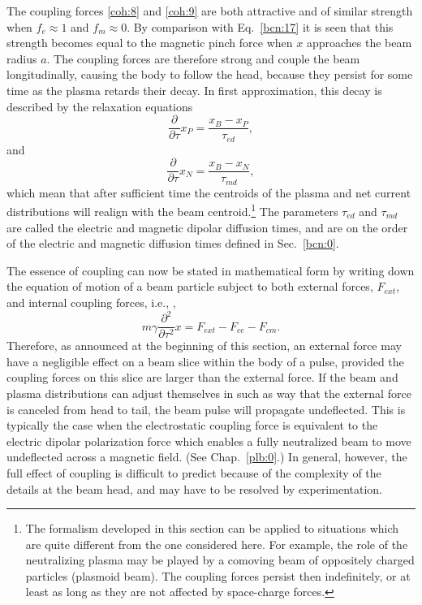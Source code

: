 \documentclass [12pt,a4paper,     ]{report} %
\begin{document}
   The coupling forces \eqref{coh:8} and \eqref{coh:9} are both attractive and of similar strength when $f_e \approx 1$ and $f_m \approx 0$.  By comparison with Eq.~\eqref{bcn:17} it is seen that this strength becomes equal to the magnetic pinch force when $x$ approaches the beam radius $a$. The coupling forces are therefore strong and couple the beam longitudinally, causing the body to follow the head, because they persist for some time as the plasma retards their decay.  In first approximation, this decay is described by the relaxation equations
%
\begin{equation}\label{coh:10} %
   \frac{\partial}{\partial \tau} x_P =  \frac{x_B-x_P}{\tau_{ed}},
\end{equation}
%
and
%
\begin{equation}\label{coh:11} %
  \frac{\partial}{\partial \tau} x_N =  \frac{x_B-x_N}{\tau_{md}},
\end{equation}
%
which mean that after sufficient time the centroids of the plasma and net current distributions will realign with the beam centroid.\footnote{The formalism developed in this section can be applied to situations which are quite different from the one considered here.  For example, the role of the neutralizing plasma may be played by a comoving beam of oppositely charged particles (plasmoid beam).  The coupling forces persist then indefinitely, or at least as long as they are not affected by space-charge forces.}  The parameters $\tau_{ed}$ and $\tau_{md}$ are called the electric and magnetic dipolar diffusion times, and are on the order of the electric and magnetic diffusion times defined in Sec.~\ref{bcn:0}.

   The essence of coupling can now be stated in mathematical form by writing down the equation of motion of a beam particle subject to both external forces, $F_{ext}$, and internal coupling forces, i.e., \cite[p.75]{BUDKE1956A}, \cite[p.685]{BUDKE1956B}
\begin{equation}\label{coh:12} %
   m \gamma \frac{\partial^2}{\partial \tau^2} x = F_{ext} - F_{ce} - F_{cm}.
\end{equation}
%
Therefore, as announced at the beginning of this section, an external force may have a negligible effect on a beam slice within the body of a pulse, provided the coupling forces on this slice are larger than the external force.  If the beam and plasma distributions can adjust themselves in such as way that the external force is canceled from head to tail, the beam pulse will propagate undeflected.  This is typically the case when the electrostatic coupling force is equivalent to the electric dipolar polarization force which enables a fully neutralized beam to move undeflected across a magnetic field. (See Chap.~\ref{plb:0}.)  In general, however, the full effect of coupling is difficult to predict because of the complexity of the details at the beam head, and may have to be resolved by experimentation.
\end{document}
